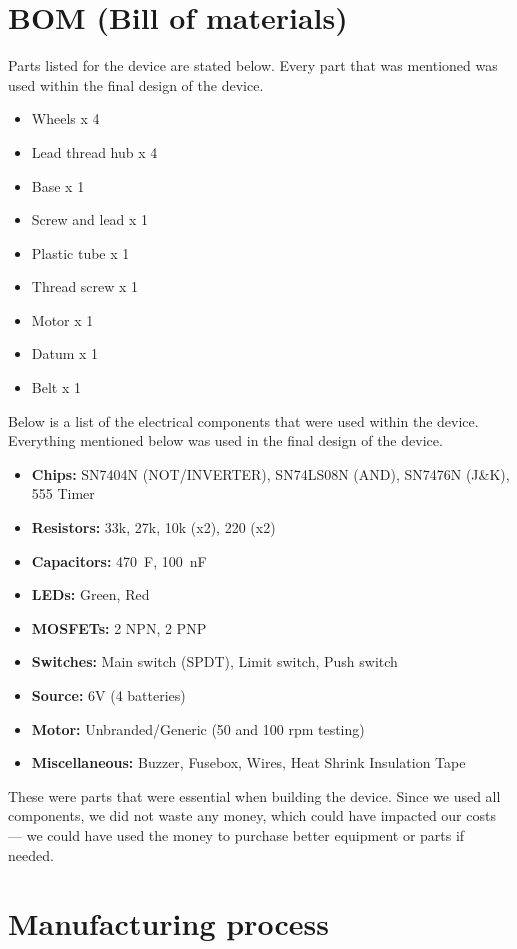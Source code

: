 \documentclass{article}
\begin{document}
\newpage\restoregeometry


\section{BOM (Bill of materials)}
Parts listed for the device are stated below. Every part that was mentioned was used within the final design of the device.
\begin{itemize}[itemsep=-1mm]
	\item Wheels x 4
	\item Lead thread hub x 4
	\item Base x 1
	\item Screw and lead x 1
	\item Plastic tube x 1
	\item Thread screw x 1
	\item Motor x 1
	\item Datum x 1
	\item Belt x 1
\end{itemize}\noindent
Below is a list of the electrical components that were used within the device. Everything mentioned below was used in the final design of the device.
\begin{itemize}[itemsep=-1mm]
	\item \textbf{Chips:} SN7404N (NOT/INVERTER), SN74LS08N (AND), SN7476N (J\&K), 555 Timer
	\item \textbf{Resistors:} 33k, 27k, 10k (x2), 220 (x2)
	\item \textbf{Capacitors:} 470~\textmu F, 100~nF
	\item \textbf{LEDs:} Green, Red
	\item \textbf{MOSFETs:} 2 NPN, 2 PNP
	\item \textbf{Switches:} Main switch (SPDT), Limit switch, Push switch
	\item \textbf{Source:} 6V (4 batteries)
	\item \textbf{Motor:} Unbranded/Generic (50 and 100 rpm testing)
	\item \textbf{Miscellaneous:} Buzzer, Fusebox, Wires, Heat Shrink Insulation Tape
\end{itemize}
These were parts that were essential when building the device. Since we used all components, we did not waste any money, which could have impacted our costs — we could have used the money to purchase better equipment or parts if needed.

\newpage
\section{Manufacturing process}
\end{document}
